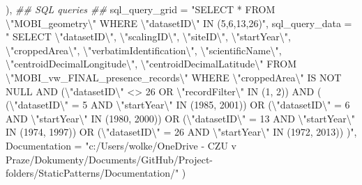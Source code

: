 \documentclass[
  letterpaper,
  DIV=11,
  numbers=noendperiod]{scrreprt}
\newenvironment{Shaded}{\begin{snugshade}}{\end{snugshade}}
\newcommand{\AttributeTok}[1]{\textcolor[rgb]{0.40,0.45,0.13}{#1}}
\newcommand{\DocumentationTok}[1]{\textcolor[rgb]{0.37,0.37,0.37}{\textit{#1}}}
\newcommand{\NormalTok}[1]{\textcolor[rgb]{0.00,0.23,0.31}{#1}}
\newcommand{\SpecialCharTok}[1]{\textcolor[rgb]{0.37,0.37,0.37}{#1}}
\newcommand{\StringTok}[1]{\textcolor[rgb]{0.13,0.47,0.30}{#1}}
\begin{document}
\begin{Shaded}
\begin{Highlighting}[]
\NormalTok{  ),}
  \DocumentationTok{\#\# SQL queries \#\#}
  \AttributeTok{sql\_query\_grid =} \StringTok{"SELECT * FROM }\SpecialCharTok{\textbackslash{}"}\StringTok{MOBI\_geometry}\SpecialCharTok{\textbackslash{}"}\StringTok{ WHERE }\SpecialCharTok{\textbackslash{}"}\StringTok{datasetID}\SpecialCharTok{\textbackslash{}"}\StringTok{ IN (5,6,13,26)"}\NormalTok{,}
  \AttributeTok{sql\_query\_data =} \StringTok{"}
\StringTok{SELECT }\SpecialCharTok{\textbackslash{}"}\StringTok{datasetID}\SpecialCharTok{\textbackslash{}"}\StringTok{, }\SpecialCharTok{\textbackslash{}"}\StringTok{scalingID}\SpecialCharTok{\textbackslash{}"}\StringTok{, }\SpecialCharTok{\textbackslash{}"}\StringTok{siteID}\SpecialCharTok{\textbackslash{}"}\StringTok{, }\SpecialCharTok{\textbackslash{}"}\StringTok{startYear}\SpecialCharTok{\textbackslash{}"}\StringTok{, }\SpecialCharTok{\textbackslash{}"}\StringTok{croppedArea}\SpecialCharTok{\textbackslash{}"}\StringTok{, }\SpecialCharTok{\textbackslash{}"}\StringTok{verbatimIdentification}\SpecialCharTok{\textbackslash{}"}\StringTok{, }\SpecialCharTok{\textbackslash{}"}\StringTok{scientificName}\SpecialCharTok{\textbackslash{}"}\StringTok{, }\SpecialCharTok{\textbackslash{}"}\StringTok{centroidDecimalLongitude}\SpecialCharTok{\textbackslash{}"}\StringTok{, }\SpecialCharTok{\textbackslash{}"}\StringTok{centroidDecimalLatitude}\SpecialCharTok{\textbackslash{}"}
\StringTok{FROM }\SpecialCharTok{\textbackslash{}"}\StringTok{MOBI\_vw\_FINAL\_presence\_records}\SpecialCharTok{\textbackslash{}"}
\StringTok{WHERE }\SpecialCharTok{\textbackslash{}"}\StringTok{croppedArea}\SpecialCharTok{\textbackslash{}"}\StringTok{ IS NOT NULL}
\StringTok{  AND (}\SpecialCharTok{\textbackslash{}"}\StringTok{datasetID}\SpecialCharTok{\textbackslash{}"}\StringTok{ \textless{}\textgreater{} 26 OR }\SpecialCharTok{\textbackslash{}"}\StringTok{recordFilter}\SpecialCharTok{\textbackslash{}"}\StringTok{ IN (1, 2))}
\StringTok{  AND (}
\StringTok{    (}\SpecialCharTok{\textbackslash{}"}\StringTok{datasetID}\SpecialCharTok{\textbackslash{}"}\StringTok{ = 5 AND }\SpecialCharTok{\textbackslash{}"}\StringTok{startYear}\SpecialCharTok{\textbackslash{}"}\StringTok{ IN (1985, 2001))}
\StringTok{    OR (}\SpecialCharTok{\textbackslash{}"}\StringTok{datasetID}\SpecialCharTok{\textbackslash{}"}\StringTok{ = 6 AND }\SpecialCharTok{\textbackslash{}"}\StringTok{startYear}\SpecialCharTok{\textbackslash{}"}\StringTok{ IN (1980, 2000))}
\StringTok{    OR (}\SpecialCharTok{\textbackslash{}"}\StringTok{datasetID}\SpecialCharTok{\textbackslash{}"}\StringTok{ = 13 AND }\SpecialCharTok{\textbackslash{}"}\StringTok{startYear}\SpecialCharTok{\textbackslash{}"}\StringTok{ IN (1974, 1997))}
\StringTok{    OR (}\SpecialCharTok{\textbackslash{}"}\StringTok{datasetID}\SpecialCharTok{\textbackslash{}"}\StringTok{ = 26 AND }\SpecialCharTok{\textbackslash{}"}\StringTok{startYear}\SpecialCharTok{\textbackslash{}"}\StringTok{ IN (1972, 2013))}
\StringTok{  )"}\NormalTok{,}
  \AttributeTok{Documentation =} \StringTok{"c:/Users/wolke/OneDrive {-} CZU v Praze/Dokumenty/Documents/GitHub/Project{-}folders/StaticPatterns/Documentation/"}
\NormalTok{)}
\end{Highlighting}
\end{Shaded}
\end{document}
